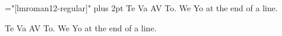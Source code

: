   
\font\lm="[lmroman12-regular]"
\lm
\spaceskip=4pt plus 2pt
Te Va AV To. We Yo at the end of a line.\par
{}
Te Va AV To. We Yo at the end of a line.\par
\bye
